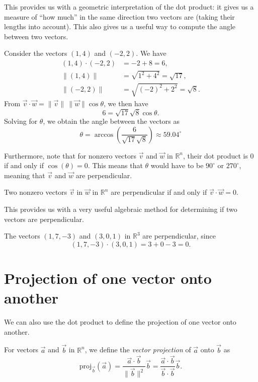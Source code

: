 \documentclass{ximera}
\begin{document}
This provides us with a geometric interpretation of the dot product: it gives us a measure of ``how much'' in the same direction two vectors are (taking their lengths into account). This also gives us a useful way to compute the angle between two vectors.

\begin{example}
Consider the vectors $(1,4)$ and $(-2,2)$. We have
\begin{align*}
(1,4)\cdot (-2,2) &= -2+8= 6,\\
\|(1,4)\| &= \sqrt{1^2+4^2} = \sqrt{17},\\
\|(-2,2)\| &= \sqrt{(-2)^2+2^2}=\sqrt{8}.
\end{align*}
From $\vec{v}\cdot\vec{w} = \|\vec{v}\|\,\|\vec{w}\|\cos\theta$, we then have
\[
6 = \sqrt{17}\sqrt{8}\cos\theta.
\]
Solving for $\theta$, we obtain the angle between the vectors as
\[
\theta = \arccos\left(\frac{6}{\sqrt{17}\sqrt{8}}\right)\approx 59.04^\circ
\]
\end{example}

Furthermore, note that for nonzero vectors $\vec{v}$ and $\vec{w}$ in $\mathbb{R}^n$, their dot product is $0$ if and only if $\cos(\theta) = 0$. This means that $\theta$ would have to be $90^\circ$ or $270^\circ$, meaning that $\vec{v}$ and $\vec{w}$ are perpendicular. 

\begin{proposition}
Two nonzero vectors $\vec{v}$ in $\vec{w}$ in $\mathbb{R}^n$ are perpendicular if and only if $\vec{v}\cdot\vec{w} = 0$.
\end{proposition}

This provides us with a very useful algebraic method for determining if two vectors are perpendicular.

\begin{example}
The vectors $(1,7,-3)$ and $(3,0,1)$ in $\mathbb{R}^3$ are perpendicular, since
\[
(1,7,-3)\cdot (3,0,1) = 3+0-3=0.
\]
\end{example}

\section{Projection of one vector onto another}

We can also use the dot product to define the projection of one vector onto another.

\begin{definition}
For vectors $\vec{a}$ and $\vec{b}$ in $\mathbb{R}^n$, we define the \emph{vector projection} of $\vec{a}$ onto $\vec{b}$ as
\[
\textrm{proj}_{\vec{b}}(\vec{a}) = \frac{\vec{a}\cdot\vec{b}}{\|\vec{b}\|^2}\vec{b}  = \frac{\vec{a}\cdot\vec{b}}{\vec{b}\cdot\vec{b}}\vec{b}.
\]
\end{definition}
\end{document}
